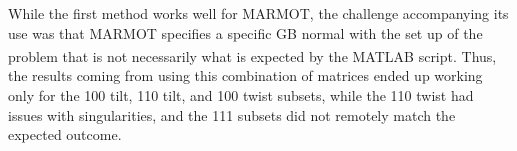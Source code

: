 \documentclass[12pt]{report}
\begin{document}
While the first method works well for MARMOT, the challenge accompanying its use was that MARMOT specifies a specific GB normal with the set up of the problem that is not necessarily what is expected by the MATLAB\textsuperscript{\textregistered} script.  Thus, the results coming from using this combination of matrices ended up working only for the \textlangle{}100\textrangle{} tilt, \textlangle{}110\textrangle{} tilt, and \textlangle{}100\textrangle{} twist subsets, while the \textlangle{}110\textrangle{} twist had issues with singularities, and the \textlangle{}111\textrangle{} subsets did not remotely match the expected outcome.

\begin{figure}[ht!]
 \centering
 \quad
 \quad

\end{figure}
\end{document}
